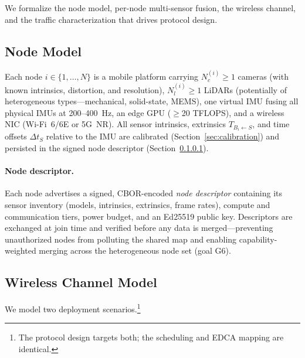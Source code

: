 \label{sec:system}

We formalize the node model, per-node multi-sensor fusion, the wireless
channel, and the traffic characterization that drives protocol design.

\subsection{Node Model}

Each node $i \in \{1,\dots,N\}$ is a mobile platform carrying $N_c^{(i)}\ge 1$
cameras (with known intrinsics, distortion, and resolution), $N_l^{(i)}\ge 1$
LiDARs (potentially of heterogeneous types---mechanical, solid-state, MEMS),
one virtual IMU fusing all physical IMUs at 200--400~Hz, an edge GPU ($\ge$20
TFLOPS), and a wireless NIC (Wi-Fi~6/6E or 5G~NR). All sensor intrinsics,
extrinsics $T_{B_i\leftarrow S}$, and time offsets $\Delta t_S$ relative to
the IMU are calibrated (Section~\ref{sec:calibration}) and persisted in the
signed node descriptor (Section~\ref{sec:descriptor}).

\paragraph{Node descriptor.}
\label{sec:descriptor}
Each node advertises a signed, CBOR-encoded \emph{node descriptor}
containing its sensor inventory (models, intrinsics, extrinsics, frame
rates), compute and communication tiers, power budget, and an Ed25519
public key. Descriptors are exchanged at join time and verified before any
data is merged---preventing unauthorized nodes from polluting the shared
map and enabling capability-weighted merging across the heterogeneous node
set (goal G6).

\subsection{Wireless Channel Model}

\label{sec:channel}

We model two deployment scenarios.\footnote{The protocol design
targets both; the scheduling and EDCA mapping are identical.}

